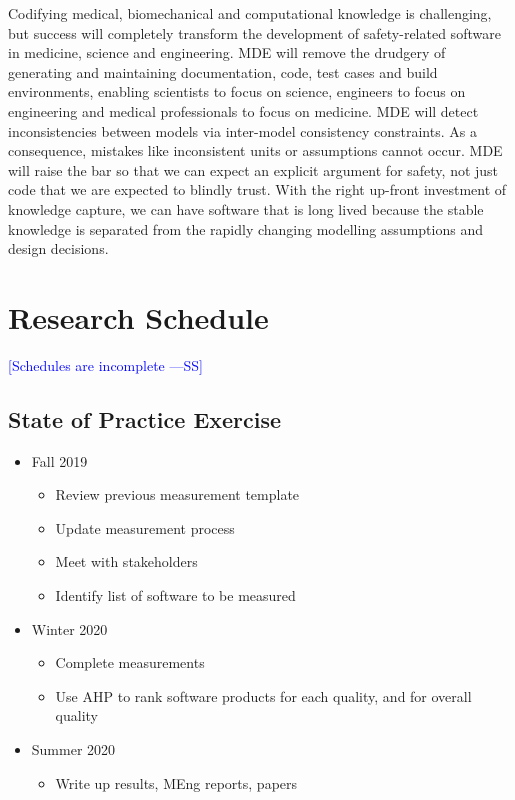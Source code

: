 \documentclass[12pt]{article}
\newcommand{\authornote}[3]{\textcolor{#1}{[#3 ---#2]}}
\newcommand{\authornote}[3]{}
\newcommand{\wss}[1]{\authornote{blue}{SS}{#1}} %
\begin{document}
Codifying medical, biomechanical and computational knowledge is challenging, but
success will completely transform the development of safety-related software in
medicine, science and engineering.  MDE will remove the drudgery of generating
and maintaining documentation, code, test cases and build environments, enabling
scientists to focus on science, engineers to focus on engineering and medical
professionals to focus on medicine.  MDE will detect inconsistencies between
models via inter-model consistency constraints.  As a consequence, mistakes like
inconsistent units or assumptions cannot occur.  MDE will raise the bar so that
we can expect an explicit argument for safety, not just code that we are
expected to blindly trust.  With the right up-front investment of knowledge
capture, we can have software that is long lived because the stable knowledge is
separated from the rapidly changing modelling assumptions and design decisions.

\section{Research Schedule} \label{SecSchedule}

\wss{Schedules are incomplete}

\subsection{State of Practice Exercise}

\begin{itemize}
\item Fall 2019
  \begin{itemize}
  \item Review previous measurement template
  \item Update measurement process
  \item Meet with stakeholders
  \item Identify list of software to be measured
  \end{itemize}
\item Winter 2020
  \begin{itemize}
  \item Complete measurements
  \item Use AHP to rank software products for each quality, and for overall
    quality
  \end{itemize}
\item Summer 2020
  \begin{itemize}
  \item Write up results, MEng reports, papers
  \end{itemize}
\end{itemize}
\end{document}
